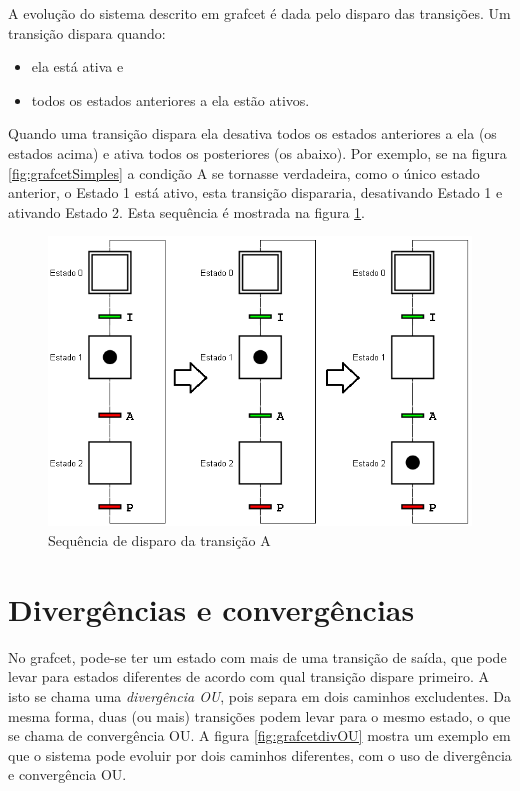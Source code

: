 A evolução do sistema descrito em grafcet é dada pelo disparo das transições. Um transição dispara quando:
\begin{itemize}
  \item ela está ativa e
  \item todos os estados anteriores a ela estão ativos.
\end{itemize}

Quando uma transição dispara ela desativa todos os estados anteriores a ela (os estados acima) e ativa todos os posteriores (os abaixo). Por exemplo, se na figura \ref{fig:grafcetSimples} a condição A se tornasse verdadeira, como o único estado anterior, o Estado 1 está ativo, esta transição dispararia, desativando Estado 1 e ativando Estado 2. Esta sequência é mostrada na figura \ref{fig:grafcetDisparo}.
\begin{figure}[hbt]
  \centering
  \includegraphics[scale=0.6]{figuras/grafcetDisparo}
  \caption{Sequência de disparo da transição A}
  \label{fig:grafcetDisparo}
\end{figure}

\section{Divergências e convergências}

No grafcet, pode-se ter um estado com mais de uma transição de saída, que pode levar para estados diferentes de acordo com qual transição dispare primeiro. A isto se chama uma \emph{divergência OU}, pois separa em dois caminhos excludentes. Da mesma forma, duas (ou mais) transições podem levar para o mesmo estado, o que se chama de convergência OU. A figura \ref{fig:grafcetdivOU} mostra um exemplo em que o sistema pode evoluir por dois caminhos diferentes, com o uso de divergência e convergência OU.

